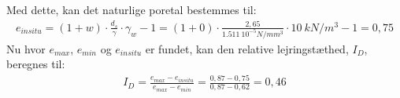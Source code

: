 Med dette, kan det naturlige poretal bestemmes til:
\begin{align*}
e_{in situ}=(1+w)\cdot\frac{d_{s}}{\gamma}\cdot \gamma_{w}-1=(1+0)\cdot\frac{2,65}{\SI{1.511}{10^{-5}N/mm^{3}}}\cdot \SI{10}{kN/m^{3}}-1=0,75
\end{align*}
Nu hvor $e_{max}$, $e_{min}$ og $e_{in situ}$ er fundet, kan den relative lejringstæthed, $I_{D}$, beregnes til:
\begin{align*}
I_{D}=\frac{e_{max}-e_{in situ}}{e_{max}-e_{min}}=\frac{0,87-0,75}{0,87-0,62}=0,46
\end{align*}

